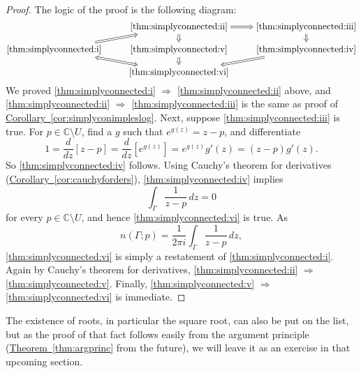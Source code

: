 \documentclass[12pt,openany]{book}
\newcommand{\C}{{\mathbb{C}}}
\theoremstyle{plain}
\theoremstyle{remark}
\theoremstyle{definition}
\theoremstyle{exercise}
\theoremstyle{example}
\newcommand{\thmref}[1]{\hyperref[#1]{Theorem~\ref*{#1}}}
\newcommand{\corref}[1]{\hyperref[#1]{Corollary~\ref*{#1}}}
\begin{document}
\begin{proof}
The logic of the proof is the following diagram:
\begin{equation*}
\begin{tikzcd}[cramped, row sep=small]
& \text{\ref{thm:simplyconnected:ii}} \arrow[d, Rightarrow] \arrow[r, Rightarrow] &
\text{\ref{thm:simplyconnected:iii}} \arrow[d, Rightarrow] \\
\text{\ref{thm:simplyconnected:i}} \arrow[ur, Rightarrow] & 
\text{\ref{thm:simplyconnected:v}} \arrow[d, Rightarrow] &
\text{\ref{thm:simplyconnected:iv}} \arrow[dl, Rightarrow] \\
& \text{\ref{thm:simplyconnected:vi}} \arrow[ul, Leftrightarrow] &
\end{tikzcd}
\end{equation*}
We proved
\ref{thm:simplyconnected:i} $\Rightarrow$
\ref{thm:simplyconnected:ii} above,
and
\ref{thm:simplyconnected:ii} $\Rightarrow$
\ref{thm:simplyconnected:iii}
is the same as proof of \corref{cor:simplyconimpleslog}.
Next, suppose \ref{thm:simplyconnected:iii} is true.  For
$p \in \C \setminus U$, find a $g$ such that
$e^{g(z)} = z-p$, and differentiate
\begin{equation*}
1 = 
\frac{d}{dz} \left[
z-p
\right]
=
\frac{d}{dz} \left[
e^{g(z)}
\right]
=
e^{g(z)} g'(z)
=
(z-p) g'(z) .
\end{equation*}
So \ref{thm:simplyconnected:iv} follows.
Using Cauchy's theorem for derivatives (\corref{cor:cauchyforders}),
\ref{thm:simplyconnected:iv} implies
\begin{equation*}
\int_\Gamma \frac{1}{z-p} \, dz = 0 
\end{equation*}
for every $p \in \C \setminus U$,
and hence 
\ref{thm:simplyconnected:vi} is true.
As 
\begin{equation*}
n(\Gamma;p) = 
\frac{1}{2\pi i}
\int_\Gamma \frac{1}{z-p} \, dz ,
\end{equation*}
\ref{thm:simplyconnected:vi} is simply a restatement of
\ref{thm:simplyconnected:i}.
Again by Cauchy's theorem for derivatives,
\ref{thm:simplyconnected:ii} $\Rightarrow$
\ref{thm:simplyconnected:v}.
Finally, \ref{thm:simplyconnected:v} $\Rightarrow$
\ref{thm:simplyconnected:vi} is immediate.
\end{proof}

The existence of roots, in particular the square root, can also be put on
the list, but as the proof of that fact follows easily from the argument principle
(\thmref{thm:argprinc} from the future),
we will leave it as an exercise in that upcoming section.
\end{document}
